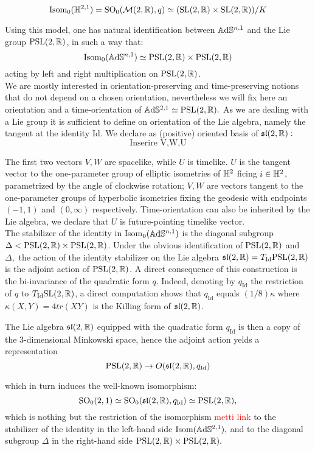 \[
    \text{Isom}_0(\mathbb{H}^{2,1})=\text{SO}_0(\mathcal{M}(2,\mathbb{R}),q)\simeq (\text{SL}(2,\mathbb{R})\times \text{SL}(2,\mathbb{R}))/K
\]
    
Using this model, one has natural identification between $\mathbb{A}\mathrm{d}\mathbb{S}^{n,1}$ and the Lie group $\text{PSL}(2,\mathbb{R})$, in such a way that: 
\[
    \text{Isom}_0(\mathbb{A}\mathrm{d}\mathbb{S}^{n,1})\simeq \text{PSL}(2,\mathbb{R})\times\text{PSL}(2,\mathbb{R})
\]
acting by left and right multiplication on $\text{PSL}(2,\mathbb{R})$.\\ We are mostly interested in orientation-preserving and time-preserving notions that do not depend on a chosen orientation, nevertheless we will fix here an orientation and a time-orientation of $\mathbb{A}\mathrm{d}\mathbb{S}^{2,1}\simeq\text{PSL}(2,\mathbb{R}).$ As we are dealing with a Lie group it is sufficient to define on orientation of the Lie algebra, namely the tangent at the identity Id. We declare as (positive) oriented basis of $\mathfrak{sl}(2,\mathbb{R}):$ 
\[
    \text{Inserire V,W,U}
\]  

The first two vectors $V,W$ are spacelike, while $U$ is timelike. $U$ is the tangent vector to the one-parameter group of elliptic isometries of $\mathbb{H}^2$ ficing $i\in\mathbb{H}^2$, parametrized by the angle of clockwise rotation; $V,W$ are vectors tangent to the one-parameter groups of hyperbolic isometries fixing the geodesic with endpoints $(-1,1)$ and $(0,\infty)$ respectively. Time-orientation can also be inherited by the Lie algebra, we declare that $U$ is future-pointing timelike vector. \\

The stabilizer of the identity in Isom$_0(\mathbb{A}\mathrm{d}\mathbb{S}^{n,1})$ is the diagonal subgroup $\Delta<\text{PSL}(2,\mathbb{R})\times\text{PSL}(2,\mathbb{R})$. Under the obvious identification of $\text{PSL}(2,\mathbb{R})$ and $\Delta,$ the action of the identity stabilizer on the Lie algebra $\mathfrak{sl}(2,\mathbb{R})=T_{\text{Id}}\text{PSL}(2,\mathbb{R})$ is the adjoint action of $\text{PSL}(2,\mathbb{R})$. A direct consequence of this construction is the bi-invariance of the quadratic form $q$. Indeed, denoting by $q_{\text{Id}}$ the restriction of $q$ to $T_{\text{Id}}\text{SL}(2,\mathbb{R})$, a direct computation shows that $q_\text{Id}$ equals $(1/8)\kappa$ where $\kappa(X,Y)=4tr(XY)$ is the Killing form of $\mathfrak{sl}(2, \mathbb{R})$.

\begin{observation}
    The Lie algebra $\mathfrak{sl}(2,\mathbb{R})$ equipped with the quadratic form $q_{\text{Id}}$ is then a copy of the 3-dimensional Minkowski space, hence the adjoint action yelds a representation 
    \[
        \text{PSL}(2,\mathbb{R})\to O(\mathfrak{sl}(2,\mathbb{R}),q_{\text{Id}})
    \]

which in turn induces the well-known isomorphism: 
\[
    \text{SO}_0(2,1)\simeq\text{SO}_0(\mathfrak{sl}(2,\mathbb{R}), q_\text{Id})\simeq \text{PSL}(2,\mathbb{R}),
\] which is nothing but the restriction of the isomorphism \textcolor{red}{metti link} to the stabilizer of the identity in the left-hand side $\text{Isom}(\mathbb{A}\mathrm{d}\mathbb{S}^{2,1}),$ and to the diagonal subgroup $\Delta$ in the right-hand side $\text{PSL}(2,\mathbb{R})\times\text{PSL}(2,\mathbb{R}).$
\end{observation}


